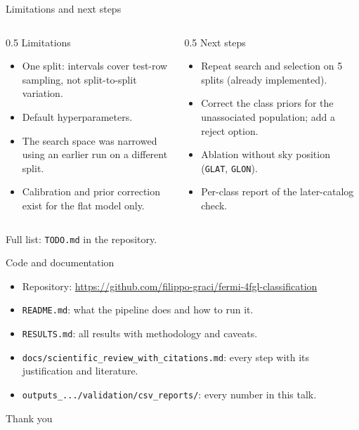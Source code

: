 \documentclass[aspectratio=169, 10pt]{beamer}
\newcommand{\cls}[1]{\texttt{#1}}
\begin{document}
\begin{frame}{Limitations and next steps}
  \begin{columns}[T]
    \begin{column}{0.5\textwidth}
      \small Limitations
      \begin{itemize}\small
        \item One split: intervals cover test-row sampling, not split-to-split variation.
        \item Default hyperparameters.
        \item The search space was narrowed using an earlier run on a different split.
        \item Calibration and prior correction exist for the flat model only.
      \end{itemize}
    \end{column}
    \begin{column}{0.5\textwidth}
      \small Next steps
      \begin{itemize}\small
        \item Repeat search and selection on 5 splits (already implemented).
        \item Correct the class priors for the unassociated population; add a reject option.
        \item Ablation without sky position (\cls{GLAT}, \cls{GLON}).
        \item Per-class report of the later-catalog check.
      \end{itemize}
    \end{column}
  \end{columns}
  \vspace{0.3cm}
  \small Full list: \cls{TODO.md} in the repository.
\end{frame}

\begin{frame}{Code and documentation}
  \begin{itemize}
    \item Repository: \url{https://github.com/filippo-graci/fermi-4fgl-classification}
    \item \cls{README.md}: what the pipeline does and how to run it.
    \item \cls{RESULTS.md}: all results with methodology and caveats.
    \item \cls{docs/scientific\_review\_with\_citations.md}: every step with its justification and
          literature.
    \item \cls{outputs\_.../validation/csv\_reports/}: every number in this talk.
  \end{itemize}
  \vspace{0.6cm}
  \centering\Large Thank you
\end{frame}
\end{document}
